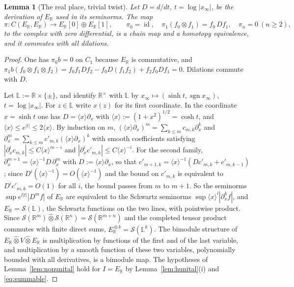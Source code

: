 \documentclass[11pt]{amsart}
\newtheorem{lemma}[theorem]{Lemma}
\theoremstyle{definition}
\theoremstyle{remark}
\newcommand{\R}{\mathbb R}
\newcommand{\sgn}{\operatorname{sgn}}
\newcommand{\id}{\operatorname{id}}
\begin{document}
\begin{lemma}[The real place, trivial twist]\label{lem:realuntw}
Let $D=d/dt$, $t=\log|x_{\infty}|$, be the derivation of $E_{\R}$ used in its
seminorms.  The map
\[
\pi:C(E_{\R},E_{\R})\to E_{\R}[0]\oplus E_{\R}[1],\qquad
\pi_0=\id,\quad \pi_1(f_0\otimes f_1)=f_0\,Df_1,\quad \pi_n=0\ (n\ge2),
\]
to the complex with zero differential, is a chain map and a homotopy
equivalence, and it commutes with all dilations.
\end{lemma}

\begin{proof}
One has $\pi_0b=0$ on $C_1$ because $E_{\R}$ is commutative, and
$\pi_1b(f_0\otimes f_1\otimes f_2)=f_0f_1Df_2-f_0D(f_1f_2)+f_2f_0Df_1=0$.
Dilations commute with $D$.

Let $\mathbb L:=\R\times\{\pm\}$, and identify $\R^{\times}$ with $\mathbb L$
by $x_{\infty}\mapsto(\sinh t,\sgn x_{\infty})$, $t=\log|x_{\infty}|$.  For
$z\in\mathbb L$ write $x(z)$ for its first coordinate.  In the coordinate
$x=\sinh t$ one has $D=\langle x\rangle\partial_x$ with
$\langle x\rangle:=(1+x^{2})^{1/2}=\cosh t$, and
$\langle x\rangle\le e^{|t|}\le2\langle x\rangle$.  By induction on $m$,
$(\langle x\rangle\partial_x)^{m}=\sum_{k\le m}c_{m,k}\partial_x^{k}$ and
$\partial_x^{m}=\sum_{k\le m}c'_{m,k}(\langle x\rangle\partial_x)^{k}$ with smooth
coefficients satisfying $|\partial_x^{i}c_{m,k}|\le C\langle x\rangle^{m-i}$ and
$|\partial_x^{i}c'_{m,k}|\le C\langle x\rangle^{-i}$.  For the second family,
$\partial_x^{m+1}=\langle x\rangle^{-1}D\,\partial_x^{m}$ with
$D:=\langle x\rangle\partial_x$, so that
$c'_{m+1,k}=\langle x\rangle^{-1}(Dc'_{m,k}+c'_{m,k-1})$; since
$D^{i}(\langle x\rangle^{-1})=O(\langle x\rangle^{-1})$ and the bound on
$c'_{m,k}$ is equivalent to $D^{i}c'_{m,k}=O(1)$ for all $i$, the bound passes
from $m$ to $m+1$.  So the seminorms
$\sup e^{l|t|}|D^{m}f|$ of $E_{\R}$ are equivalent to the Schwartz seminorms
$\sup\langle x\rangle^{l}|\partial_x^{k}f|$, and $E_{\R}=\mathcal S(\mathbb L)$,
the Schwartz functions on the two lines, with pointwise product.  Since
$\mathcal S(\R^{m})\widehat\otimes\mathcal S(\R^{n})=\mathcal S(\R^{m+n})$
\cite[Theorem~51.6]{Treves} and the completed tensor product commutes with
finite direct sums, $E_{\R}^{\widehat\otimes k}=\mathcal S(\mathbb L^{k})$.  The
bimodule structure of $E_{\R}\widehat\otimes V\widehat\otimes E_{\R}$ is
multiplication by functions of the first and of the last variable, and
multiplication by a smooth function of these two variables, polynomially
bounded with all derivatives, is a bimodule map.  The hypotheses of
Lemma~\ref{lem:nonunital} hold for $I=E_{\R}$ by Lemma~\ref{lem:hunital}(i)
and \eqref{eq:summable}.


\end{proof}
\end{document}
